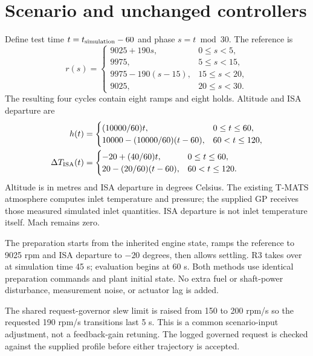 \documentclass[11pt,a4paper]{article}
\begin{document}
\section{Scenario and unchanged controllers}
Define test time $t=t_{\rm simulation}-60$ and phase $s=t\bmod30$. The reference is
\begin{equation}
r(s)=\begin{cases}9025+190s,&0\leq s<5,\\9975,&5\leq s<15,\\9975-190(s-15),&15\leq s<20,\\9025,&20\leq s<30.\end{cases}
\end{equation}
The resulting four cycles contain eight ramps and eight holds. Altitude and ISA departure are
\begin{align}
h(t)&=\begin{cases}(10000/60)t,&0\leq t\leq60,\\10000-(10000/60)(t-60),&60<t\leq120,\end{cases}\\
\Delta T_{\rm ISA}(t)&=\begin{cases}-20+(40/60)t,&0\leq t\leq60,\\20-(20/60)(t-60),&60<t\leq120.\end{cases}
\end{align}
Altitude is in metres and ISA departure in degrees Celsius. The existing T-MATS atmosphere computes inlet temperature and pressure; the supplied GP receives those measured simulated inlet quantities. ISA departure is not inlet temperature itself. Mach remains zero.

The preparation starts from the inherited engine state, ramps the reference to 9025 rpm and ISA departure to $-20$ degrees, then allows settling. R3 takes over at simulation time 45 s; evaluation begins at 60 s. Both methods use identical preparation commands and plant initial state. No extra fuel or shaft-power disturbance, measurement noise, or actuator lag is added.

The shared request-governor slew limit is raised from 150 to 200 rpm/s so the requested 190 rpm/s transitions last 5 s. This is a common scenario-input adjustment, not a feedback-gain retuning. The logged governed request is checked against the supplied profile before either trajectory is accepted.
\end{document}
